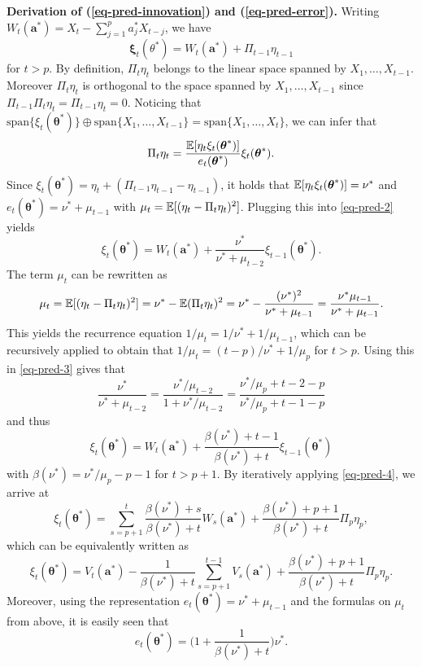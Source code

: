 \documentclass[a4paper,12pt]{article}
\begin{document}
\textbf{Derivation of (\ref{eq-pred-innovation}) and (\ref{eq-pred-error}).} Writing $W_t(\boldsymbol{a}^*) = X_t - \sum_{j=1}^p a_j^* X_{t-j}$, we have
\begin{equation}\label{eq-pred-1}
\boldsymbol{\xi}_t(\theta^*) = W_t(\boldsymbol{a}^*) + \Pi_{t-1} \eta_{t-1} 
\end{equation}
for $t > p$. By definition, $\Pi_t \eta_t$ belongs to the linear space spanned by $X_1,\ldots,X_{t-1}$. Moreover $\Pi_t \eta_t$ is orthogonal to the space spanned by $X_1,\ldots,X_{t-1}$ since $\Pi_{t-1} \Pi_t \eta_t = \Pi_{t-1} \eta_t = 0$. Noticing that $\text{span}\{\xi_t(\boldsymbol{\theta}^*)\} \oplus \text{span}\{X_1,\ldots,X_{t-1}\} = \text{span}\{X_1,\ldots,X_t\}$, we can infer that 
\begin{equation}\label{eq-pred-2}
\Pi_t \eta_t = \frac{\mathbb{E}[\eta_t \xi_t(\boldsymbol{\theta}^*)]}{e_t(\boldsymbol{\theta}^*)} \xi_t(\boldsymbol{\theta}^*). 
\end{equation}
Since $\xi_t(\boldsymbol{\theta}^*) = \eta_t + (\Pi_{t-1} \eta_{t-1} - \eta_{t-1})$, it holds that $\mathbb{E}[\eta_t \xi_t(\boldsymbol{\theta}^*)] = \nu^*$ and $e_t(\boldsymbol{\theta}^*) = \nu^* + \mu_{t-1}$ with $\mu_t = \mathbb{E}[(\eta_t - \Pi_t \eta_t)^2]$. Plugging this into \eqref{eq-pred-2} yields 
\begin{equation}\label{eq-pred-3}
\xi_t(\boldsymbol{\theta}^*) = W_t(\boldsymbol{a}^*) + \frac{\nu^*}{\nu^* + \mu_{t-2}} \xi_{t-1}(\boldsymbol{\theta}^*). 
\end{equation}
The term $\mu_t$ can be rewritten as 
\[ \mu_t = \mathbb{E}[(\eta_t - \Pi_t \eta_t)^2] = \nu^* - \mathbb{E}(\Pi_t\eta_t)^2 = \nu^* - \frac{(\nu^*)^2}{\nu^* + \mu_{t-1}} = \frac{\nu^* \mu_{t-1}}{\nu^* + \mu_{t-1}}. \] 
This yields the recurrence equation $1/\mu_t = 1/\nu^* + 1/\mu_{t-1}$, which can be recursively applied to obtain that $1/\mu_t = (t-p)/\nu^* + 1/\mu_p$ for $t > p$. Using this in \eqref{eq-pred-3} gives that 
\[ \frac{\nu^*}{\nu^* + \mu_{t-2}} = \frac{\nu^*/\mu_{t-2}}{1 + \nu^*/\mu_{t-2}} =  \frac{\nu^*/\mu_p + t - 2 - p}{\nu^*/\mu_p + t - 1 - p} \]
and thus
\begin{equation}\label{eq-pred-4}
\xi_t(\boldsymbol{\theta}^*) = W_t(\boldsymbol{a}^*) + \frac{\beta(\nu^*) + t - 1}{\beta(\nu^*) + t} \xi_{t-1}(\boldsymbol{\theta}^*) 
\end{equation}
with $\beta(\nu^*) = \nu^*/\mu_p - p - 1$ for $t > p+1$. By iteratively applying \eqref{eq-pred-4}, we arrive at 
\[ \xi_t(\boldsymbol{\theta}^*) = \sum\limits_{s=p+1}^t \frac{\beta(\nu^*) + s}{\beta(\nu^*) + t} W_s(\boldsymbol{a}^*) + \frac{\beta(\nu^*) + p + 1}{\beta(\nu^*) + t} \Pi_p \eta_p, \] 
which can be equivalently written as
\[ \xi_t(\boldsymbol{\theta}^*) = V_t(\boldsymbol{a}^*) - \frac{1}{\beta(\nu^*) + t} \sum\limits_{s=p+1}^{t-1} V_s(\boldsymbol{a}^*) + \frac{\beta(\nu^*)+p+1}{\beta(\nu^*) + t} \Pi_p \eta_p. \]
Moreover, using the representation $e_t(\boldsymbol{\theta}^*) = \nu^* + \mu_{t-1}$ and the formulas on $\mu_t$ from above, it is easily seen that 
\[ e_t(\boldsymbol{\theta}^*) = \Big( 1 + \frac{1}{\beta(\nu^*)+t} \Big) \nu^*. \]
\end{document}
